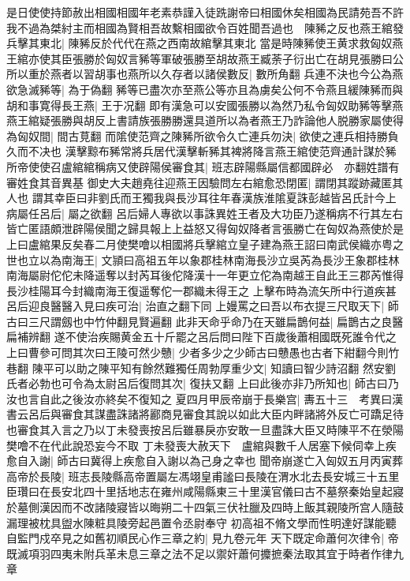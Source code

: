 是日使使持節赦出相國相國年老素恭謹入徒跣謝帝曰相國休矣相國為民請苑吾不許我不過為桀紂主而相國為賢相吾故繫相國欲令百姓聞吾過也　陳豨之反也燕王綰發兵擊其東北|{
	陳豨反於代代在燕之西南故綰擊其東北}
當是時陳豨使王黄求救匈奴燕王綰亦使其臣張勝於匈奴言豨等軍破張勝至胡故燕王臧荼子衍出亡在胡見張勝曰公所以重於燕者以習胡事也燕所以久存者以諸侯數反|{
	數所角翻}
兵連不決也今公為燕欲急滅豨等|{
	為于偽翻}
豨等已盡次亦至燕公等亦且為虜矣公何不令燕且緩陳豨而與胡和事寛得長王燕|{
	王于况翻}
即有漢急可以安國張勝以為然乃私令匈奴助豨等擊燕燕王綰疑張勝與胡反上書請族張勝勝還具道所以為者燕王乃詐論他人脱勝家屬使得為匈奴間|{
	間古莧翻}
而隂使范齊之陳豨所欲令久亡連兵勿決|{
	欲使之連兵相持勝負久而不决也}
漢擊黥布豨常將兵居代漢擊斬豨其裨將降言燕王綰使范齊通計謀於豨所帝使使召盧綰綰稱病又使辟陽侯審食其|{
	班志辟陽縣屬信都國辟必　亦翻姓譜有審姓食其音異基}
御史大夫趙堯往迎燕王因驗問左右綰愈恐閉匿|{
	謂閉其蹤跡藏匿其人也}
謂其幸臣曰非劉氏而王獨我與長沙耳往年春漢族淮隂夏誅彭越皆呂氏計今上病屬任呂后|{
	屬之欲翻}
呂后婦人專欲以事誅異姓王者及大功臣乃遂稱病不行其左右皆亡匿語頗泄辟陽侯聞之歸具報上上益怒又得匈奴降者言張勝亡在匈奴為燕使於是上曰盧綰果反矣春二月使樊噲以相國將兵擊綰立皇子建為燕王詔曰南武侯織亦粤之世也立以為南海王|{
	文頴曰高祖五年以象郡桂林南海長沙立吳芮為長沙王象郡桂林南海屬尉佗佗未降遥奪以封芮耳後佗降漢十一年更立佗為南越王自此王三郡芮惟得長沙桂陽耳今封織南海王復遥奪佗一郡織未得王之}
上擊布時為流矢所中行道疾甚呂后迎良醫醫入見曰疾可治|{
	治直之翻下同}
上嫚罵之曰吾以布衣提三尺取天下|{
	師古曰三尺謂劔也中竹仲翻見賢遍翻}
此非天命乎命乃在天雖扁鵲何益|{
	扁鵲古之良醫扁補辨翻}
遂不使治疾賜黄金五十斤罷之呂后問曰陛下百歲後蕭相國既死誰令代之上曰曹參可問其次曰王陵可然少戇|{
	少者多少之少師古曰戇愚也古者下紺翻今則竹巷翻}
陳平可以助之陳平知有餘然難獨任周勃厚重少文|{
	知讀曰智少詩沼翻}
然安劉氏者必勃也可令為太尉呂后復問其次|{
	復扶又翻}
上曰此後亦非乃所知也|{
	師古曰乃汝也言自此之後汝亦終矣不復知之}
夏四月甲辰帝崩于長樂宫|{
	夀五十三　考異曰漢書云呂后與審食其謀盡誅諸將酈商見審食其說以如此大臣内畔諸將外反亡可蹻足待也審食其入言之乃以丁未發喪按呂后雖暴戾亦安敢一旦盡誅大臣又時陳平不在滎陽樊噲不在代此說恐妄今不取}
丁未發喪大赦天下　盧綰與數千人居塞下候伺幸上疾愈自入謝|{
	師古曰冀得上疾愈自入謝以為己身之幸也}
聞帝崩遂亡入匈奴五月丙寅葬高帝於長陵|{
	班志長陵縣高帝置屬左馮翊皇甫謐曰長陵在渭水北去長安城三十五里臣瓚曰在長安北四十里括地志在雍州咸陽縣東三十里漢官儀曰古不墓祭秦始皇起寢於墓側漢因而不改諸陵寢皆以晦朔二十四氣三伏社臘及四時上飯其親陵所宫人隨鼓漏理被枕具盥水陳粧具陵旁起邑置令丞尉奉守}
初高祖不脩文學而性明達好謀能聽自監門戍卒見之如舊初順民心作三章之約|{
	見九卷元年}
天下既定命蕭何次律令|{
	帝既滅項羽四夷未附兵革未息三章之法不足以禦奸蕭何攗摭秦法取其宜于時者作律九章}
